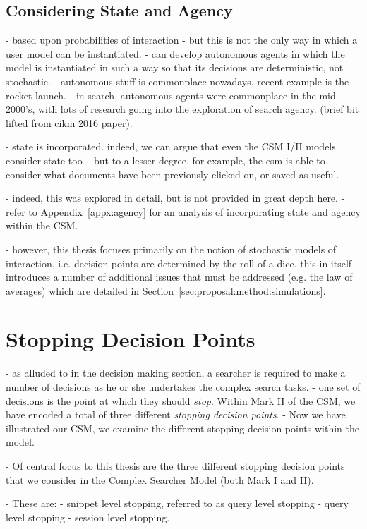 \subsection{Considering State and Agency}
- based upon probabilities of interaction
- but this is not the only way in which a user model can be instantiated.
- can develop autonomous agents in which the model is instantiated in such a way so that its decisions are deterministic, not stochastic.
- autonomous stuff is commonplace nowadays, recent example is the rocket launch.
- in search, autonomous agents were commonplace in the mid 2000's, with lots of research going into the exploration of search agency. (brief bit lifted from cikm 2016 paper).

- state is incorporated. indeed, we can argue that even the CSM I/II models consider state too -- but to a lesser degree. for example, the csm is able to consider what documents have been previously clicked on, or saved as useful.

- indeed, this was explored in detail, but is not provided in great depth here.
- refer to Appendix~\ref{appx:agency} for an analysis of incorporating state and agency within the CSM.

- however, this thesis focuses primarily on the notion of stochastic models of interaction, i.e. decision points are determined by the roll of a dice. this in itself introduces a number of additional issues that must be addressed (e.g. the law of averages) which are detailed in Section~\ref{sec:proposal:method:simulations}.

\section{Stopping Decision Points}\label{sec:proposal:stopping_points}
- as alluded to in the decision making section, a searcher is required to make a number of decisions as he or she undertakes the complex search tasks.
- one set of decisions is the point at which they should \emph{stop}. Within Mark II of the CSM, we have encoded a total of three different \emph{stopping decision points}.
- Now we have illustrated our CSM, we examine the different stopping decision points within the model.

- Of central focus to this thesis are the three different stopping decision points that we consider in the Complex Searcher Model (both Mark I and II).

- These are:
    - snippet level stopping, referred to as query level stopping
    - query level stopping
    - session level stopping.

